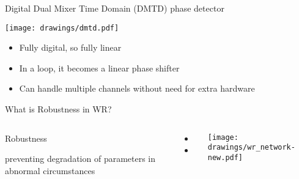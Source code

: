 \documentclass[compress,red]{beamer}
\begin{document}
\begin{frame}{Digital Dual Mixer Time Domain (DMTD) phase detector}
\begin{center}
\texttt{[image: drawings/dmtd.pdf]}
\end{center}
\begin{itemize}
\item Fully digital, so fully linear
\item In a loop, it becomes a linear phase shifter
\item Can handle multiple channels without need for extra hardware
\end{itemize}
\end{frame}





\begin{frame}{What is Robustness in WR?}
\begin{columns}[c]

    \begin{block}{\center Robustness}
      \begin{center}
	preventing degradation of parameters in abnormal circumstances
      \end{center}
    \end{block}

  \vspace{0.2cm}

  \begin{itemize}
    \item \color{blue!90}{Sub-nanosecond time synchronization}
    \item \color{red}{Deterministic Control Data delivery}
  \end{itemize}

    \begin{center}
    \texttt{[image: drawings/wr\_network-new.pdf]}
    \end{center}
\end{columns}
\end{frame}
\end{document}
